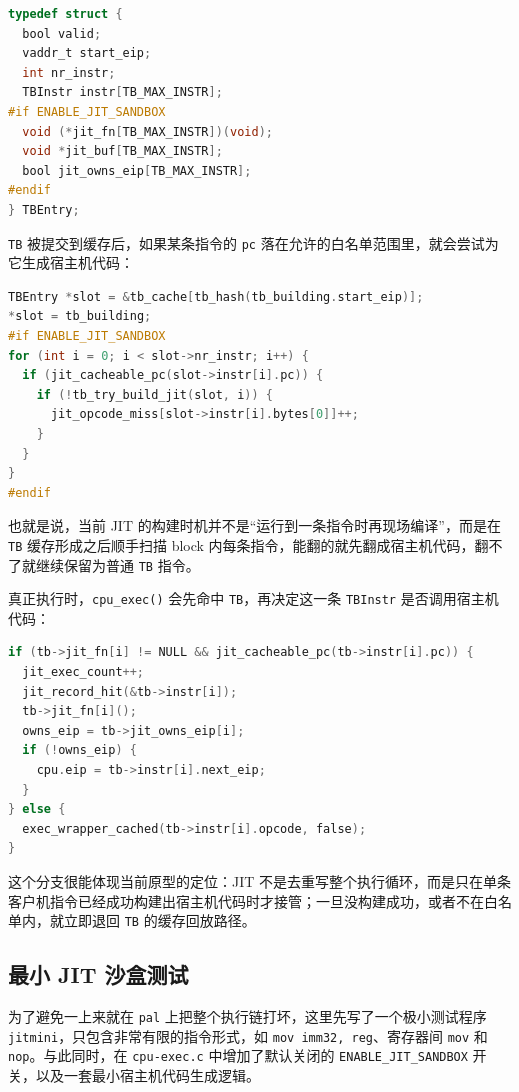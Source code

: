 \documentclass[a4paper]{article}
\begin{document}
\begin{lstlisting}[language=C]
typedef struct {
  bool valid;
  vaddr_t start_eip;
  int nr_instr;
  TBInstr instr[TB_MAX_INSTR];
#if ENABLE_JIT_SANDBOX
  void (*jit_fn[TB_MAX_INSTR])(void);
  void *jit_buf[TB_MAX_INSTR];
  bool jit_owns_eip[TB_MAX_INSTR];
#endif
} TBEntry;
\end{lstlisting}

\texttt{TB} 被提交到缓存后，如果某条指令的 \texttt{pc} 落在允许的白名单范围里，就会尝试为它生成宿主机代码：

\begin{lstlisting}[language=C]
TBEntry *slot = &tb_cache[tb_hash(tb_building.start_eip)];
*slot = tb_building;
#if ENABLE_JIT_SANDBOX
for (int i = 0; i < slot->nr_instr; i++) {
  if (jit_cacheable_pc(slot->instr[i].pc)) {
    if (!tb_try_build_jit(slot, i)) {
      jit_opcode_miss[slot->instr[i].bytes[0]]++;
    }
  }
}
#endif
\end{lstlisting}

也就是说，当前 JIT 的构建时机并不是“运行到一条指令时再现场编译”，而是在 \texttt{TB} 缓存形成之后顺手扫描 block 内每条指令，能翻的就先翻成宿主机代码，翻不了就继续保留为普通 \texttt{TB} 指令。

真正执行时，\texttt{cpu\_exec()} 会先命中 \texttt{TB}，再决定这一条 \texttt{TBInstr} 是否调用宿主机代码：

\begin{lstlisting}[language=C]
if (tb->jit_fn[i] != NULL && jit_cacheable_pc(tb->instr[i].pc)) {
  jit_exec_count++;
  jit_record_hit(&tb->instr[i]);
  tb->jit_fn[i]();
  owns_eip = tb->jit_owns_eip[i];
  if (!owns_eip) {
    cpu.eip = tb->instr[i].next_eip;
  }
} else {
  exec_wrapper_cached(tb->instr[i].opcode, false);
}
\end{lstlisting}

这个分支很能体现当前原型的定位：JIT 不是去重写整个执行循环，而是只在单条客户机指令已经成功构建出宿主机代码时才接管；一旦没构建成功，或者不在白名单内，就立即退回 \texttt{TB} 的缓存回放路径。

\subsection{最小 JIT 沙盒测试}
为了避免一上来就在 \texttt{pal} 上把整个执行链打坏，这里先写了一个极小测试程序 \texttt{jitmini}，只包含非常有限的指令形式，如 \texttt{mov imm32, reg}、寄存器间 \texttt{mov} 和 \texttt{nop}。与此同时，在 \texttt{cpu-exec.c} 中增加了默认关闭的 \texttt{ENABLE\_JIT\_SANDBOX} 开关，以及一套最小宿主机代码生成逻辑。
\end{document}
